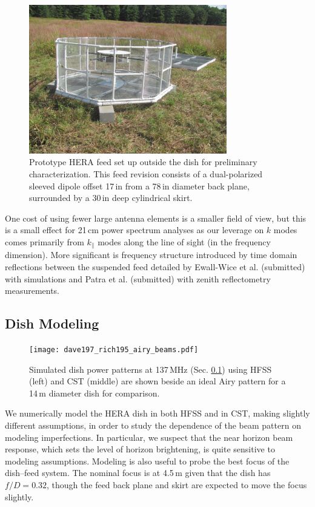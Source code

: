 \documentclass{emulateapj}
\begin{document}
\begin{figure}[h]
\includegraphics[width=3.4in]{feed.jpg}
\caption{Prototype HERA feed set up outside the dish for preliminary characterization. This feed revision consists of a dual-polarized sleeved dipole offset 17\,in from a 78\,in diameter back plane, surrounded by a 30\,in deep cylindrical skirt.}
\label{fig:feedphoto}
\end{figure}

One cost of using fewer large antenna elements is a smaller field of view, but this is a 
small effect for 21\,cm power spectrum analyses as our leverage on $k$ modes comes primarily from $k_\parallel$ modes along the line of sight (in the frequency dimension). More significant is frequency structure introduced by time domain reflections between the suspended feed detailed by Ewall-Wice et al. (submitted) with simulations and Patra et al. (submitted) with zenith reflectometry measurements.

\subsection{Dish Modeling}
\label{sec:dishmodels}

\begin{figure}
\centering
\texttt{[image: dave197\_rich195\_airy\_beams.pdf]}
\caption{Simulated dish power patterns at 137\,MHz (Sec. \ref{sec:dishmodels}) using HFSS (left) and CST (middle) are shown beside an ideal Airy pattern for a 14\,m diameter dish for comparison.}
\label{fig:modelbeams}
\end{figure}

We numerically model the HERA dish in both HFSS and in CST, making slightly different assumptions, in order to study the dependence of the beam pattern on modeling imperfections. In particular, we suspect that the near horizon beam response, which sets the level of horizon brightening, is quite sensitive to modeling assumptions. Modeling is also useful to probe the best focus of the dish--feed system. The nominal focus is at 4.5\,m given that the dish has $f/D=0.32$, though the feed back plane and skirt are expected to move the focus slightly.
\end{document}
